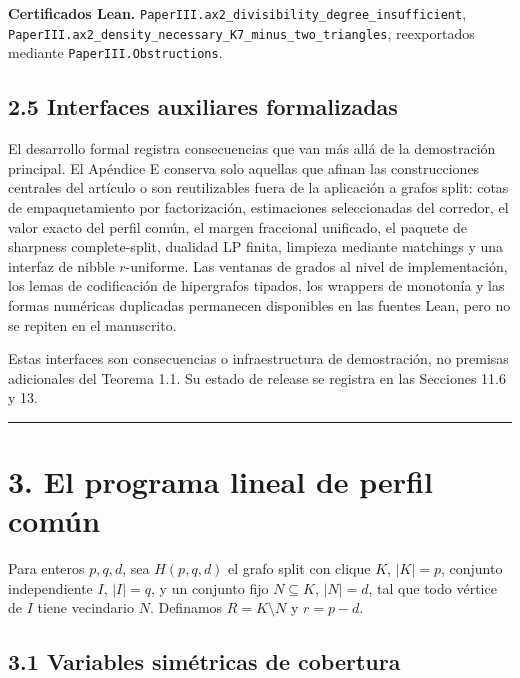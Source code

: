 \documentclass[
  spanish,
  11pt,
  a4paper,
]{article}
\begin{document}
\textbf{Certificados Lean.} \texttt{PaperIII.ax2\_divisibility\_degree\_insufficient}, \texttt{PaperIII.ax2\_density\_necessary\_K7\_minus\_two\_triangles}, reexportados mediante \texttt{PaperIII.Obstructions}.

\subsection{2.5 Interfaces auxiliares formalizadas}\label{interfaces-auxiliares-formalizadas}

El desarrollo formal registra consecuencias que van más allá de la demostración principal. El Apéndice E conserva solo aquellas que afinan las construcciones centrales del artículo o son reutilizables fuera de la aplicación a grafos split: cotas de empaquetamiento por factorización, estimaciones seleccionadas del corredor, el valor exacto del perfil común, el margen fraccional unificado, el paquete de sharpness complete-split, dualidad LP finita, limpieza mediante matchings y una interfaz de nibble \(r\)-uniforme. Las ventanas de grados al nivel de implementación, los lemas de codificación de hipergrafos tipados, los wrappers de monotonía y las formas numéricas duplicadas permanecen disponibles en las fuentes Lean, pero no se repiten en el manuscrito.

Estas interfaces son consecuencias o infraestructura de demostración, no premisas adicionales del Teorema 1.1. Su estado de release se registra en las Secciones 11.6 y 13.

\begin{center}\rule{0.5\linewidth}{0.5pt}\end{center}

\section{3. El programa lineal de perfil común}\label{el-programa-lineal-de-perfil-comuxfan}

Para enteros \(p,q,d\), sea \(H(p,q,d)\) el grafo split con clique \(K\), \(|K|=p\), conjunto independiente \(I\), \(|I|=q\), y un conjunto fijo \(N\subseteq K\), \(|N|=d\), tal que todo vértice de \(I\) tiene vecindario \(N\). Definamos \(R=K\setminus N\) y \(r=p-d\).

\subsection{3.1 Variables simétricas de cobertura}\label{variables-simuxe9tricas-de-cobertura}
\end{document}
